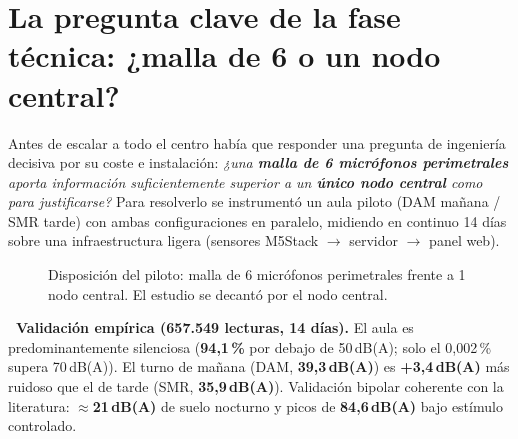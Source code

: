 \documentclass[11pt,a4paper]{article}
\begin{document}
\section{La pregunta clave de la fase t\'ecnica: ¿malla de 6 o un nodo central?}

Antes de escalar a todo el centro hab\'ia que responder una pregunta de ingenier\'ia decisiva por su coste e instalaci\'on: \emph{¿una \textbf{malla de 6 micr\'ofonos perimetrales} aporta informaci\'on suficientemente superior a un \textbf{\'unico nodo central} como para justificarse?} Para resolverlo se instrument\'o un aula piloto (DAM ma\~nana / SMR tarde) con ambas configuraciones en paralelo, midiendo en continuo 14 d\'ias sobre una infraestructura ligera (sensores M5Stack $\rightarrow$ servidor $\rightarrow$ panel web).

\begin{figure}[H]
\centering
{}
\caption{Disposici\'on del piloto: \textcolor{CorpBlue}{malla de 6 micr\'ofonos perimetrales} frente a \textcolor{CorpAccent}{1 nodo central}. El estudio se decant\'o por el nodo central.}
\end{figure}

\begin{KeyFinding}
\textbf{\faChartBar\ Validaci\'on emp\'irica (657.549 lecturas, 14 d\'ias).} El aula es predominantemente silenciosa (\textbf{94,1\,\%} por debajo de 50\,dB(A); solo el 0,002\,\% supera 70\,dB(A)). El turno de ma\~nana (DAM, \textbf{39,3\,dB(A)}) es \textbf{+3,4\,dB(A)} m\'as ruidoso que el de tarde (SMR, \textbf{35,9\,dB(A)}). Validaci\'on bipolar coherente con la literatura: \textbf{$\approx$21\,dB(A)} de suelo nocturno y picos de \textbf{84,6\,dB(A)} bajo est\'imulo controlado.
\end{KeyFinding}
\end{document}
